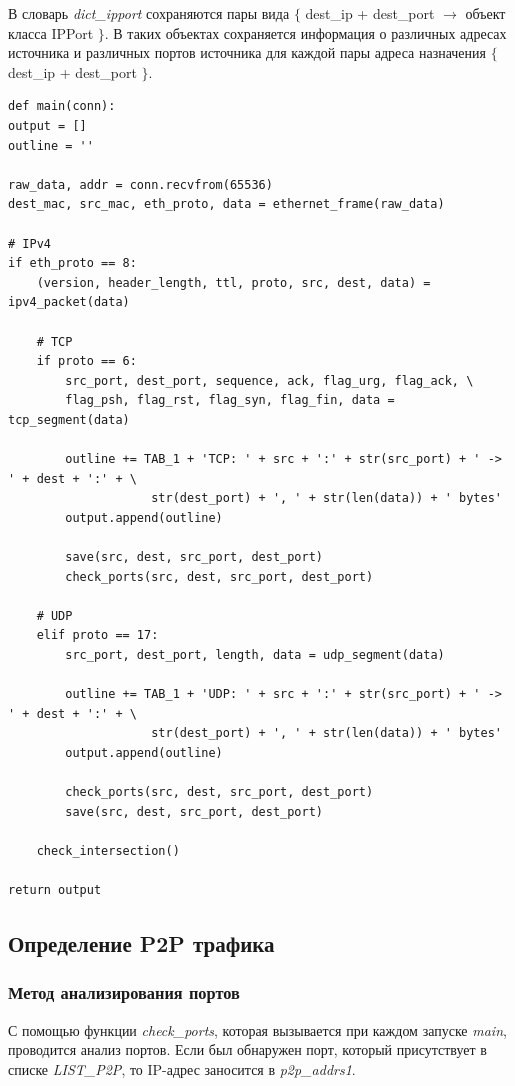 \documentclass[bachelor, och, coursework]{SCWorks}
\begin{document}
В словарь \textit{dict_ipport} сохраняются пары вида $\{$ dest_ip + dest_port $\to$ объект класса IPPort $\}$. 
В таких объектах сохраняется информация о различных адресах источника и различных портов источника для каждой пары адреса назначения
$\{$ dest_ip + dest_port $\}$.

\begin{verbatim}
def main(conn):
output = []
outline = ''

raw_data, addr = conn.recvfrom(65536)
dest_mac, src_mac, eth_proto, data = ethernet_frame(raw_data)

# IPv4
if eth_proto == 8:
    (version, header_length, ttl, proto, src, dest, data) = ipv4_packet(data)

    # TCP
    if proto == 6:
        src_port, dest_port, sequence, ack, flag_urg, flag_ack, \
        flag_psh, flag_rst, flag_syn, flag_fin, data = tcp_segment(data)

        outline += TAB_1 + 'TCP: ' + src + ':' + str(src_port) + ' -> ' + dest + ':' + \
                    str(dest_port) + ', ' + str(len(data)) + ' bytes'
        output.append(outline)

        save(src, dest, src_port, dest_port)
        check_ports(src, dest, src_port, dest_port)

    # UDP
    elif proto == 17:
        src_port, dest_port, length, data = udp_segment(data)

        outline += TAB_1 + 'UDP: ' + src + ':' + str(src_port) + ' -> ' + dest + ':' + \
                    str(dest_port) + ', ' + str(len(data)) + ' bytes'
        output.append(outline)

        check_ports(src, dest, src_port, dest_port)
        save(src, dest, src_port, dest_port)

    check_intersection()

return output    
\end{verbatim}

\subsection{Определение P2P трафика}
\subsubsection{Метод анализирования портов}
С помощью функции \textit{check_ports}, которая вызывается при каждом запуске \textit{main}, проводится анализ портов. 
Если был обнаружен порт, который присутствует в списке \textit{LIST_P2P}, то IP-адрес заносится в \textit{p2p_addrs1}.
\end{document}
